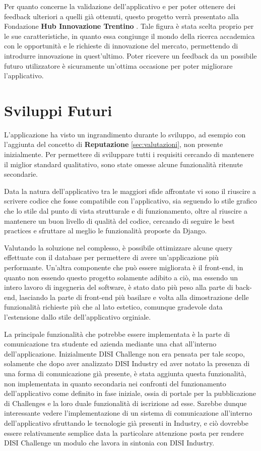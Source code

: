 Per quanto concerne la validazione dell'applicativo e per poter ottenere dei feedback ulteriori a quelli già ottenuti, questo progetto verrà presentato alla Fondazione \textbf{Hub Innovazione Trentino} \cite{HiT}. Tale figura è stata scelta proprio per le sue caratteristiche, in quanto essa congiunge il mondo della ricerca accademica con le opportunità e le richieste di innovazione del mercato, permettendo di introdurre innovazione in quest'ultimo. Poter ricevere un feedback da un possibile futuro utilizzatore è sicuramente un'ottima occasione per poter migliorare l'applicativo.


\section{Sviluppi Futuri}
L'applicazione ha visto un ingrandimento durante lo sviluppo, ad esempio con l'aggiunta del concetto di \textbf{Reputazione} \ref{sec:valutazioni}, non presente inizialmente. Per permettere di sviluppare tutti i requisiti cercando di mantenere il miglior standard qualitativo, sono state omesse alcune funzionalità ritenute secondarie.


Data la natura dell'applicativo tra le maggiori sfide affrontate vi sono il riuscire a scrivere codice che fosse compatibile con l'applicativo, sia seguendo lo stile grafico che lo stile dal punto di vista strutturale e di funzionamento, oltre al riuscire a mantenere un buon livello di qualità del codice, cercando di seguire le best practices e sfruttare al meglio le funzionalità proposte da Django.


Valutando la soluzione nel complesso, è possibile ottimizzare alcune query effettuate con il database per permettere di avere un'applicazione più performante. Un'altra componente che può essere migliorata è il front-end, in quanto non essendo questo progetto solamente adibito a ciò, ma essendo un intero lavoro di ingegneria del software, è stato dato più peso alla parte di back-end, lasciando la parte di front-end più basilare e volta alla dimostrazione delle funzionalità richieste più che al lato estetico, comunque gradevole data l'estensione dallo stile dell'applicativo orginiale.


La principale funzionalità che potrebbe essere implementata è la parte di comunicazione tra studente ed azienda mediante una chat all'interno dell'applicazione. Inizialmente DISI Challenge non era pensata per tale scopo, solamente che dopo aver analizzato DISI Industry ed aver notato la presenza di una forma di comunicazione già presente, è stata aggiunta questa funzionalità, non implementata in quanto secondaria nei confronti del funzionamento dell'applicativo come definito in fase iniziale, ossia di portale per la pubblicazione di Challenges e la loro duale funzionalità di iscrizione ad esse. Sarebbe dunque interessante vedere l'implementazione di un sistema di comunicazione all'interno dell'applicativo sfruttando le tecnologie già presenti in Industry, e ciò dovrebbe essere relativamente semplice data la particolare attenzione posta per rendere DISI Challenge un modulo che lavora in sintonia con DISI Industry.

